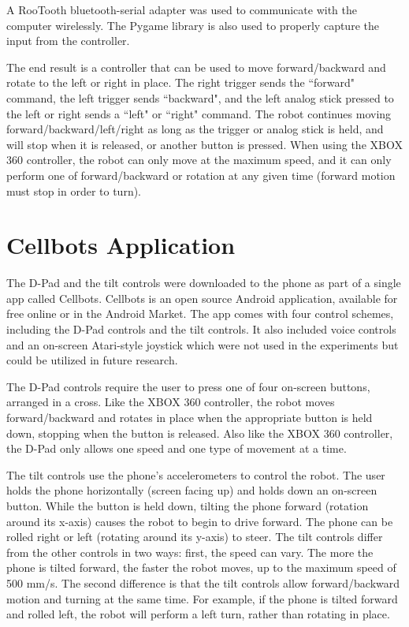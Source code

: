 \documentclass[12pt,a4paper]{report}
\begin{document}
A RooTooth bluetooth-serial adapter was used to communicate with the computer wirelessly. The Pygame library is also used to properly capture the input from the controller. 

The end result is a controller that can be used to move forward/backward and rotate to the left or right in place. The right trigger sends the ``forward" command, the left trigger sends ``backward", and the left analog stick pressed to the left or right sends a ``left" or ``right" command. The robot continues moving forward/backward/left/right as long as the trigger or analog stick is held, and will stop when it is released, or another button is pressed. When using the XBOX 360 controller, the robot can only move at the maximum speed, and it can only perform one of forward/backward or rotation at any given time (forward motion must stop in order to turn).

\section{Cellbots Application}
The D-Pad and the tilt controls were downloaded to the phone as part of a single app called Cellbots. Cellbots is an open source Android application, available for free online or in the Android Market. The app comes with four control schemes, including the D-Pad controls and the tilt controls. It also included voice controls and an on-screen Atari-style joystick which were not used in the experiments but could be utilized in future research.

The D-Pad controls require the user to press one of four on-screen buttons, arranged in a cross. Like the XBOX 360 controller, the robot moves forward/backward and rotates in place when the appropriate button is held down, stopping when the button is released. Also like the XBOX 360 controller, the D-Pad only allows one speed and one type of movement at a time.

The tilt controls use the phone's accelerometers to control the robot. The user holds the phone horizontally (screen facing up) and holds down an on-screen button. While the button is held down, tilting the phone forward (rotation around its x-axis) causes the robot to begin to drive forward. The phone can be rolled right or left (rotating around its y-axis) to steer. 
The tilt controls differ from the other controls in two ways: first, the speed can vary. The more the phone is tilted forward, the faster the robot moves, up to the maximum speed of 500 mm/s.  The second difference is that the tilt controls allow forward/backward motion and turning at the same time. For example, if the phone is tilted forward and rolled left, the robot will perform a left turn, rather than rotating in place.
\end{document}
